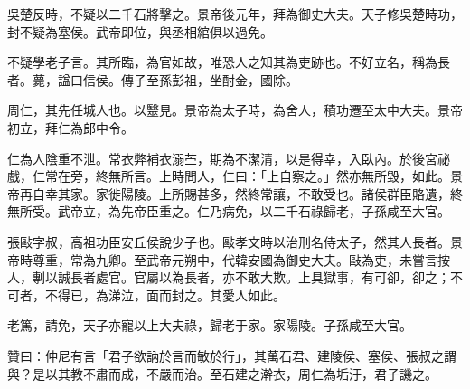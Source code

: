 \begin{pinyinscope}
吳楚反時，不疑以二千石將擊之。景帝後元年，拜為御史大夫。天子修吳楚時功，封不疑為塞侯。武帝即位，與丞相綰俱以過免。

不疑學老子言。其所臨，為官如故，唯恐人之知其為吏跡也。不好立名，稱為長者。薨，諡曰信侯。傳子至孫彭祖，坐酎金，國除。

周仁，其先任城人也。以毉見。景帝為太子時，為舍人，積功遷至太中大夫。景帝初立，拜仁為郎中令。

仁為人陰重不泄。常衣弊補衣溺苎，期為不潔清，以是得幸，入臥內。於後宮祕戲，仁常在旁，終無所言。上時問人，仁曰：「上自察之。」然亦無所毀，如此。景帝再自幸其家。家徙陽陵。上所賜甚多，然終常讓，不敢受也。諸侯群臣賂遺，終無所受。武帝立，為先帝臣重之。仁乃病免，以二千石祿歸老，子孫咸至大官。

張敺字叔，高祖功臣安丘侯說少子也。敺孝文時以治刑名侍太子，然其人長者。景帝時尊重，常為九卿。至武帝元朔中，代韓安國為御史大夫。敺為吏，未嘗言按人，剸以誠長者處官。官屬以為長者，亦不敢大欺。上具獄事，有可卻，卻之；不可者，不得已，為涕泣，面而封之。其愛人如此。

老篤，請免，天子亦寵以上大夫祿，歸老于家。家陽陵。子孫咸至大官。

贊曰：仲尼有言「君子欲訥於言而敏於行」，其萬石君、建陵侯、塞侯、張叔之謂與？是以其教不肅而成，不嚴而治。至石建之澣衣，周仁為垢汙，君子譏之。


\end{pinyinscope}